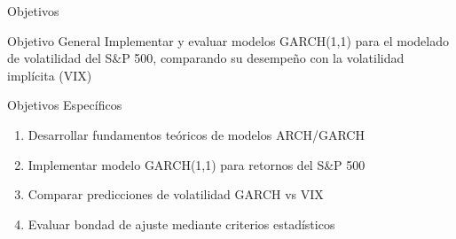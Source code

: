 \begin{frame}{Objetivos}
    \begin{block}{Objetivo General}
        Implementar y evaluar modelos GARCH(1,1) para el modelado de volatilidad del S\&P 500, comparando su desempeño con la volatilidad implícita (VIX)
    \end{block}
    
    \vspace{0.5em}
    
    \begin{block}{Objetivos Específicos}
        \begin{enumerate}
            \item Desarrollar fundamentos teóricos de modelos ARCH/GARCH
            \item Implementar modelo GARCH(1,1) para retornos del S\&P 500
            \item Comparar predicciones de volatilidad GARCH vs VIX
            \item Evaluar bondad de ajuste mediante criterios estadísticos
        \end{enumerate}
    \end{block}
\end{frame}